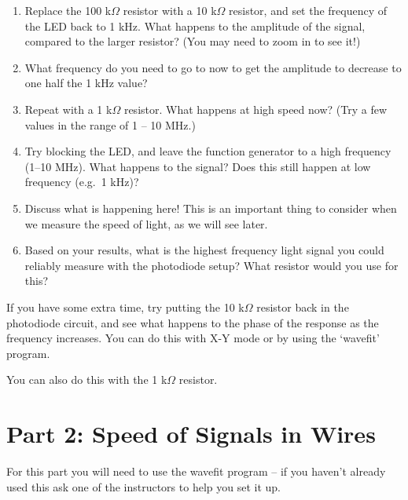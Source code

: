 \documentclass[12pt, letterpaper]{article}
\begin{document}
\begin{enumerate}
	\answergrid{3cm}
\item Replace the 100 k$\Omega$ resistor with a 10 k$\Omega$ resistor, and set the frequency of the LED back to 1 kHz.
What happens to the amplitude of the signal, compared to the larger resistor?  (You may need to zoom in to see it!)

	\answergrid{3cm}
\item What frequency do you need to go to now to get the amplitude to decrease to one half the 1 kHz value?

	\answergrid{3cm}
\item Repeat with a 1 k$\Omega$ resistor.
What happens at high speed now?  (Try a few values in the range of 1 -- 10 MHz.)


	\fillanswergrid
	
	\item Try blocking the LED, and leave the function generator to a high frequency (1--10 MHz).
What happens to the signal?
Does this still happen at low frequency (e.g.~1 kHz)?

	\answergrid{5cm}
\item Discuss what is happening here!  This is an important thing to consider when we measure the speed of light, as we will see later.

\item
Based on your results, what is the highest frequency light signal you could reliably measure with the photodiode setup?
What resistor would you use for this?

	\answergrid{5cm}
\end{enumerate}

If you have some extra time, try putting the 10 k$\Omega$ resistor back in the photodiode circuit, and see what happens to the phase of the response as the frequency increases. 
You can do this with X-Y mode or by using the `wavefit' program.

You can also do this with the 1 k$\Omega$ resistor.

\section{Part 2: Speed of Signals in Wires}
For this part you will need to use the wavefit program -- if you haven't already used this ask one of the instructors to help you set it up.
\end{document}
